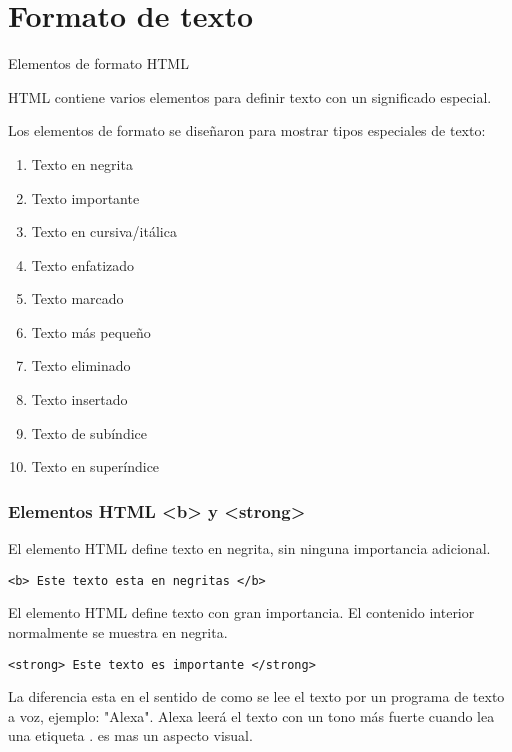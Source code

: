 
\section{Formato de texto}

\begin{frame}[c]{Elementos de formato HTML}

  HTML contiene varios elementos para definir texto con
  un significado especial.

  Los elementos de formato se diseñaron para mostrar tipos
  especiales de texto:

  \vspace{\baselineskip}
  \begin{enumerate}
    \item {} Texto en negrita
    \item {} Texto importante
    \item {} Texto en cursiva/itálica
    \item {} Texto enfatizado
    \item {} Texto marcado
    \item {} Texto más pequeño
    \item {} Texto eliminado
    \item {} Texto insertado
    \item {} Texto de subíndice
    \item {} Texto en superíndice
  \end{enumerate}
\end{frame}

\begin{frame}[fragile]
  \frametitle{Elementos HTML <b> y <strong>}

  El elemento HTML  define texto en negrita,
  sin ninguna importancia adicional.

  \begin{lstlisting}
<b> Este texto esta en negritas </b>
  \end{lstlisting}

  \vspace{\baselineskip}
  El elemento HTML  define texto con gran importancia.
  El contenido interior normalmente se muestra en negrita.

  \begin{lstlisting}
<strong> Este texto es importante </strong>
  \end{lstlisting}

  \begin{block}{La diferencia}
    esta en el sentido de como se lee el texto por un programa
    de texto a voz, ejemplo: "Alexa". Alexa leerá el texto con un tono más
    fuerte cuando lea una etiqueta .  es mas un aspecto
    visual.
  \end{block}
\end{frame}

